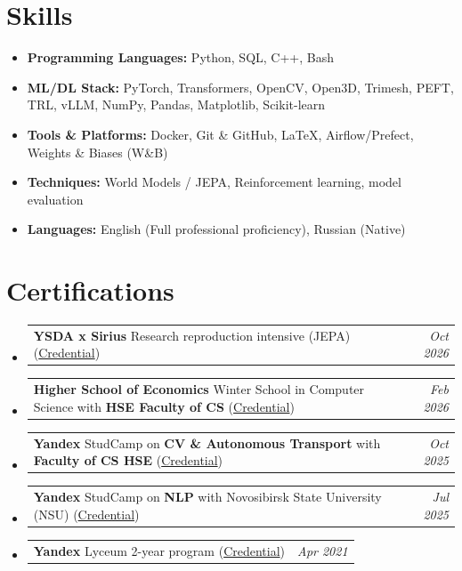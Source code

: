 \documentclass[a4paper,10pt]{article}
\makeatletter
\newcommand{\awardItem}[2]{
  \item
    \begin{tabular*}{\textwidth}{@{}p{0.78\textwidth}@{\extracolsep{\fill}}r@{}}
      #1 & \textit{#2} \\
    \end{tabular*}
}
\makeatother
\begin{document}
\section*{Skills}
\begin{itemize}[leftmargin=0.5cm, label={}]
  \item \textbf{Programming Languages:} Python, SQL, C++, Bash
  \item \textbf{ML/DL Stack:} PyTorch, Transformers, OpenCV, Open3D, Trimesh, PEFT, TRL, vLLM, NumPy, Pandas, Matplotlib, Scikit-learn
  \item \textbf{Tools \& Platforms:} Docker, Git \& GitHub, LaTeX, Airflow/Prefect, Weights \& Biases (W\&B)
  \item \textbf{Techniques:} World Models / JEPA, Reinforcement learning, model evaluation
  \item \textbf{Languages:} English (Full professional proficiency), Russian (Native)
\end{itemize}

\section*{Certifications}

\begin{itemize}[leftmargin=0.15in, label={}]
  \awardItem{\textbf{YSDA x Sirius} Research reproduction intensive (JEPA) (\href{https://github.com/SUPERustam/SUPERustam/blob/master/Honors/Sirius_Rustam_Uzdenov_2026.pdf}{Credential})}{Oct 2026}
  \awardItem{\textbf{Higher School of Economics} Winter School in Computer Science with \textbf{HSE Faculty of CS} (\href{https://www.linkedin.com/in/superustam/overlay/Certifications/1393739222/treasury/?profileId=ACoAADvobuIBpfb9SlRUgZGiOhCe_4OtbvHIomk}{Credential})}{Feb 2026}
  \awardItem{\textbf{Yandex} StudCamp on \textbf{CV \& Autonomous Transport} with \textbf{Faculty of CS HSE} (\href{https://education.yandex.ru/profile/docs?id=a3fe1bfd-01b2-42af-90b8-6c7a87c431ef}{Credential})}{Oct 2025}
  \awardItem{\textbf{Yandex} StudCamp on \textbf{NLP} with Novosibirsk State University (NSU) (\href{https://education.yandex.ru/profile/docs?id=8bc78ae0-00c9-4d0b-b39c-3423d470dd3a}{Credential})}{Jul 2025}
  \awardItem{\textbf{Yandex} Lyceum 2-year program (\href{https://www.linkedin.com/in/superustam/}{Credential})}{Apr 2021}
\end{itemize}


\end{document}
